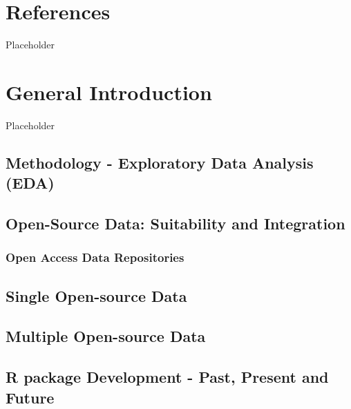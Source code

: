 \documentclass[print]{nuthesis}
\begin{document}
\hypertarget{references}{%
\chapter*{References}\label{references}}

Placeholder

\hypertarget{general-introduction}{%
\chapter{General Introduction}\label{general-introduction}}

Placeholder

\hypertarget{methodology---exploratory-data-analysis-eda}{%
\section{Methodology - Exploratory Data Analysis (EDA)}\label{methodology---exploratory-data-analysis-eda}}

\hypertarget{open-source-data-suitability-and-integration}{%
\section{Open-Source Data: Suitability and Integration}\label{open-source-data-suitability-and-integration}}

\hypertarget{open-access-data-repositories}{%
\subsection{Open Access Data Repositories}\label{open-access-data-repositories}}

\hypertarget{single-open-source-data}{%
\section{Single Open-source Data}\label{single-open-source-data}}

\hypertarget{multiple-open-source-data}{%
\section{Multiple Open-source Data}\label{multiple-open-source-data}}

\hypertarget{r-package-development---past-present-and-future}{%
\section{R package Development - Past, Present and Future}\label{r-package-development---past-present-and-future}}
\end{document}
